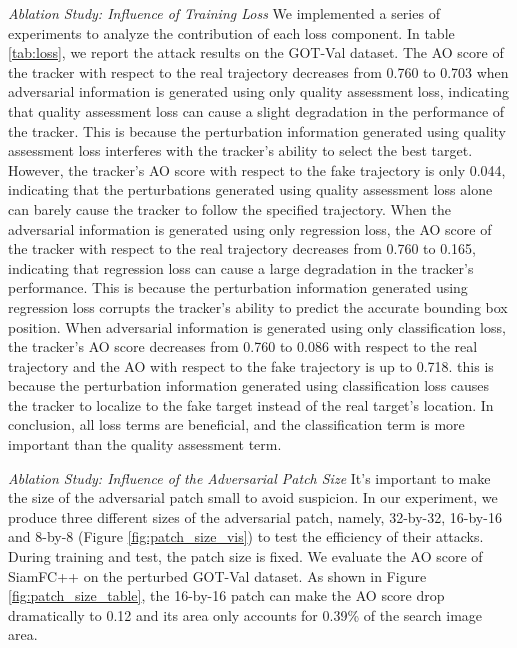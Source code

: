 \documentclass[journal]{IEEEtran}
\begin{document}
\textit{Ablation Study: Influence of Training Loss} We implemented a series of experiments to analyze the contribution of each loss component. In table \ref{tab:loss}, we report the attack results on the GOT-Val dataset. The AO score of the tracker with respect to the real trajectory decreases from 0.760 to 0.703 when adversarial information is generated using only quality assessment loss, indicating that quality assessment loss can cause a slight degradation in the performance of the tracker. This is because the perturbation information generated using quality assessment loss interferes with the tracker's ability to select the best target. However, the tracker's AO score with respect to the fake trajectory is only 0.044, indicating that the perturbations generated using quality assessment loss alone can barely cause the tracker to follow the specified trajectory. When the adversarial information is generated using only regression loss, the AO score of the tracker with respect to the real trajectory decreases from 0.760 to 0.165, indicating that regression loss can cause a large degradation in the tracker's performance. This is because the perturbation information generated using regression loss corrupts the tracker's ability to predict the accurate bounding box position. When adversarial information is generated using only classification loss, the tracker's AO score decreases from 0.760 to 0.086 with respect to the real trajectory and the AO with respect to the fake trajectory is up to 0.718. this is because the perturbation information generated using classification loss causes the tracker to localize to the fake target instead of the real target's location. In conclusion, all loss terms are beneficial, and the classification term is more important than the quality assessment term.

\textit{Ablation Study: Influence of the Adversarial Patch Size} 
It's important to make the size of the adversarial patch small to avoid suspicion. In our experiment, we produce three different sizes of the adversarial patch, namely, 32-by-32, 16-by-16 and 8-by-8 (Figure \ref{fig:patch_size_vis}) to test the efficiency of their attacks. During training and test, the patch size is fixed. We evaluate the AO score of SiamFC++ on the perturbed GOT-Val dataset.
As shown in Figure \ref{fig:patch_size_table}, the 16-by-16 patch can make the AO score drop dramatically to 0.12 and its area only accounts for 0.39\% of the search image area.
\end{document}
